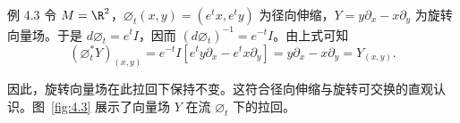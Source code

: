 \begin{statement}{例 4.3}{}
令 $M=\R^2$，$\varnothing_t(x,y)=(e^tx,e^ty)$ 为径向伸缩，$Y=y\partial_x-x\partial_y$ 为旋转向量场。于是 $d\varnothing_t=e^t I$，因而 $(d\varnothing_t)^{-1}=e^{-t}I$。由上式可知
\[
  (\varnothing_t^*Y)_{(x,y)}
    =e^{-t}I[e^ty\partial_x-e^tx\partial_y]
    =y\partial_x-x\partial_y=Y_{(x,y)}.
\]

\begin{figure}[!htb]
  \centering
  
\end{figure}
因此，旋转向量场在此拉回下保持不变。这符合径向伸缩与旋转可交换的直观认识。图~\ref{fig:4.3} 展示了向量场 $Y$ 在流 $\varnothing_t$ 下的拉回。
\end{statement}
